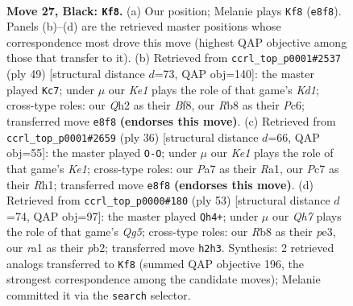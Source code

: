 \documentclass[11pt]{article}
\begin{document}
\clearpage

\begin{figure}[p]\centering
\begin{subfigure}{0.46\textwidth}\centering
\resizebox{\linewidth}{!}{%
\newchessgame
\chessboard[
  setfen={1rb1k1r1/p1p2p2/2p1pQ1p/2P3p1/8/3B4/P6q/R2KR3 b - - 4 27},
  showmover=false,
  pgfstyle=straightmove, color=movearrow, markmove={e8-f8}
]}
\caption{}
\end{subfigure}\hfill
\begin{subfigure}{0.46\textwidth}\centering
\resizebox{\linewidth}{!}{%
\newchessgame
\chessboard[
  setfen={r2k1b2/4p1p1/2ppR3/5pQ1/p7/2P5/P1KR2PP/5q2 b - - 3 25},
  showmover=false,
  pgfstyle=straightmove, color=movearrow, markmove={d8-c7}
]}
\caption{}
\end{subfigure}
\\[4pt]
\begin{subfigure}{0.46\textwidth}\centering
\resizebox{\linewidth}{!}{%
\newchessgame
\chessboard[
  setfen={3r3r/kpp2Qpp/8/6q1/1bB5/1P5P/P2P1PP1/R3K2R w KQ - 0 19},
  showmover=false,
  pgfstyle=straightmove, color=movearrow, markmove={e1-g1}
]}
\caption{}
\end{subfigure}\hfill
\begin{subfigure}{0.46\textwidth}\centering
\resizebox{\linewidth}{!}{%
\newchessgame
\chessboard[
  setfen={2kr4/1p3pQp/p3p1p1/P1P5/6q1/4P3/1PP5/R4R1K b - - 7 27},
  showmover=false,
  pgfstyle=straightmove, color=movearrow, markmove={g4-h4}
]}
\caption{}
\end{subfigure}
\caption{\textbf{Move 27, Black: \texttt{Kf8}.} (a) Our position; Melanie plays \texttt{Kf8} (\texttt{e8f8}). Panels (b)--(d) are the retrieved master positions whose correspondence most drove this move (highest QAP objective among those that transfer to it). (b) Retrieved from \texttt{ccrl\_top\_p0001\#2537} (ply 49) [structural distance $d$=73, QAP obj=140]: the master played \texttt{Kc7}; under $\mu$ our \emph{Ke1} plays the role of that game's \emph{Kd1}; cross-type roles: our \emph{Q}h2 as their \emph{B}f8, our \emph{R}b8 as their \emph{P}c6; transferred move \texttt{e8f8} \textbf{(endorses this move)}. (c) Retrieved from \texttt{ccrl\_top\_p0001\#2659} (ply 36) [structural distance $d$=66, QAP obj=55]: the master played \texttt{O-O}; under $\mu$ our \emph{Ke1} plays the role of that game's \emph{Ke1}; cross-type roles: our \emph{P}a7 as their \emph{R}a1, our \emph{P}c7 as their \emph{R}h1; transferred move \texttt{e8f8} \textbf{(endorses this move)}. (d) Retrieved from \texttt{ccrl\_top\_p0000\#180} (ply 53) [structural distance $d$=74, QAP obj=97]: the master played \texttt{Qh4+}; under $\mu$ our \emph{Qh7} plays the role of that game's \emph{Qg5}; cross-type roles: our \emph{R}b8 as their \emph{p}e3, our \emph{r}a1 as their \emph{p}b2; transferred move \texttt{h2h3}. Synthesis: 2 retrieved analogs transferred to \texttt{Kf8} (summed QAP objective 196, the strongest correspondence among the candidate moves); Melanie committed it via the \texttt{search} selector.}
\label{fig:thought-m53}
\end{figure}
\end{document}

